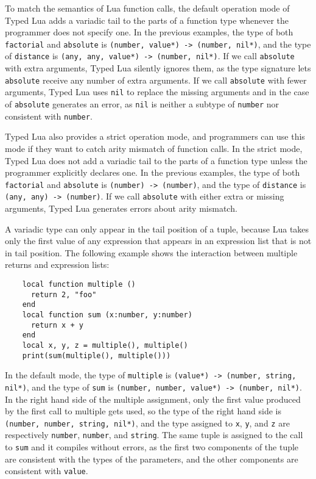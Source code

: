 To match the semantics of Lua function calls, the default operation
mode of Typed Lua adds a variadic tail to the parts of a function
type whenever the programmer does not specify one.
In the previous examples, the type of both \texttt{factorial} and
\texttt{absolute} is \texttt{(number, value*) -> (number, nil*)},
and the type of \texttt{distance} is \texttt{(any, any, value*) -> (number, nil*)}.
If we call \texttt{absolute} with extra arguments, Typed Lua silently ignores
them, as the type signature lets \texttt{absolute} receive any number of
extra arguments.
If we call \texttt{absolute} with fewer arguments, Typed Lua uses \texttt{nil} to
replace the missing arguments and in the case of \texttt{absolute} generates
an error, as \texttt{nil} is neither a subtype of \texttt{number} nor consistent
with \texttt{number}.

Typed Lua also provides a strict operation mode, and programmers can
use this mode if they want to catch arity mismatch of function calls.
In the strict mode, Typed Lua does not add a variadic tail to the
parts of a function type unless the programmer explicitly declares one.
In the previous examples, the type of both \texttt{factorial} and
\texttt{absolute} is \texttt{(number) -> (number)},
and the type of \texttt{distance} is \texttt{(any, any) -> (number)}.
If we call \texttt{absolute} with either extra or missing arguments,
Typed Lua generates errors about arity mismatch.

A variadic type can only appear in the tail position of a tuple,
because Lua takes only the first value of any expression that appears
in an expression list that is not in tail position.
The following example shows the interaction between multiple returns
and expression lists:
\begin{verbatim}
    local function multiple ()
      return 2, "foo"
    end
    local function sum (x:number, y:number)
      return x + y
    end
    local x, y, z = multiple(), multiple()
    print(sum(multiple(), multiple()))
\end{verbatim}

In the default mode, the type of \texttt{multiple} is
\texttt{(value*) -> (number, string, nil*)},
and the type of \texttt{sum} is \texttt{(number, number, value*) -> (number, nil*)}.
In the right hand side of the multiple assignment, only the first
value produced by the first call to multiple gets used,
so the type of the right hand side is
\texttt{(number, number, string, nil*)},
and the type assigned to \texttt{x}, \texttt{y}, and \texttt{z}
are respectively \texttt{number}, \texttt{number}, and \texttt{string}.
The same tuple is assigned to the call to \texttt{sum} and it
compiles without errors, as the first two components of the tuple
are consistent with the types of the parameters, and the other
components are consistent with \texttt{value}.

